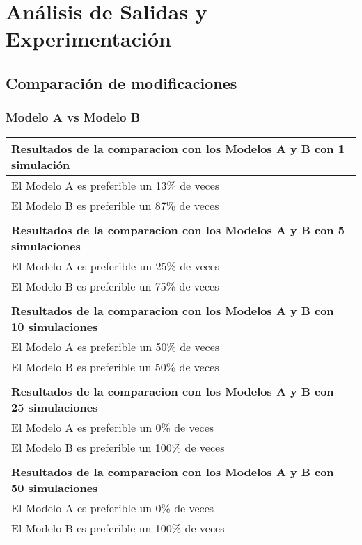 \chapter{Análisis de Salidas y Experimentación}

\section{Comparación de modificaciones}

\subsection{Modelo A vs Modelo B}
\begin{table}[H]
\centering
\begin{tabular}{|l|}
\hline
\textbf{Resultados de la comparacion con los Modelos A  y B con 1 simulación} \\ \hline
El Modelo A es preferible un 13\% de veces \\ \hline
El Modelo B es preferible un 87\% de veces \\ \hline
 \\ \hline
\textbf{Resultados de la comparacion con los Modelos A  y B con 5 simulaciones} \\ \hline
El Modelo A es preferible un 25\% de veces \\ \hline
El Modelo B es preferible un 75\% de veces \\ \hline
 \\ \hline
\textbf{Resultados de la comparacion con los Modelos A  y B con 10 simulaciones} \\ \hline
El Modelo A es preferible un 50\% de veces \\ \hline
El Modelo B es preferible un 50\% de veces \\ \hline
 \\ \hline
\textbf{Resultados de la comparacion con los Modelos A  y B con 25 simulaciones} \\ \hline
El Modelo A es preferible un 0\% de veces \\ \hline
El Modelo B es preferible un 100\% de veces \\ \hline
 \\ \hline
\textbf{Resultados de la comparacion con los Modelos A  y B con 50 simulaciones} \\ \hline
El Modelo A es preferible un 0\% de veces \\ \hline
El Modelo B es preferible un 100\% de veces \\ \hline

\end{tabular}
\end{table}
